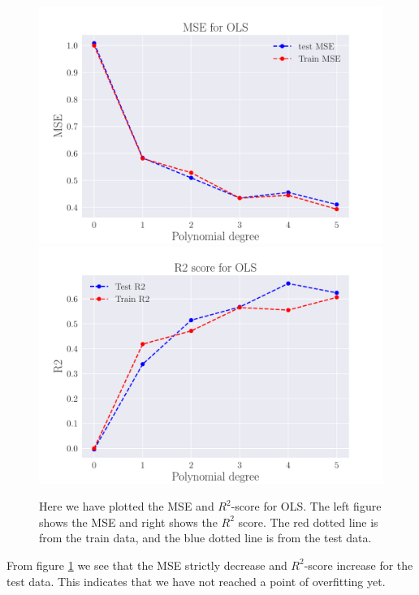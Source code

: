 \documentclass[reprint,english,notitlepage,aps,nobalancelastpage,nofootinbib]{revtex4-1}  %
\begin{document}
\begin{figure}[H]
	\includegraphics[width=\linewidth]{MSE_OLS_n30_eps02_pol5.pdf}
	\endminipage\hfill
	\includegraphics[width=\linewidth]{R2_OLS_n30_eps02_pol5.pdf}
	\endminipage
	\caption{Here we have plotted the MSE and $R^2$-score for OLS. The left figure shows the MSE and right shows the $R^2$ score. The red dotted line is from the train data, and the blue dotted line is from the test data.}\label{fig:OLS_R2_and_MSE}
\end{figure}
From figure \ref{fig:OLS_R2_and_MSE} we see that the MSE strictly decrease and $R^2$-score increase for the test data. This indicates that we have not reached a point of overfitting yet.
\end{document}
